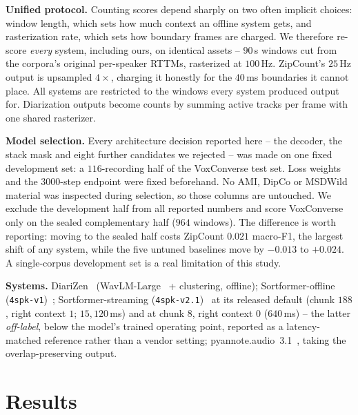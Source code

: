 \documentclass[10pt,conference]{IEEEtran}
\newcommand{\sys}{ZipCount}
\begin{document}
\textbf{Unified protocol.} Counting scores depend sharply on two often
implicit choices: window length, which sets how much context an offline
system gets, and rasterization rate, which sets how boundary frames are
charged. We therefore re-score \emph{every} system, including ours, on
identical assets -- $90$\,s windows cut from the corpora's original
per-speaker RTTMs, rasterized at $100$\,Hz. \sys{}'s $25$\,Hz output is
upsampled $4\times$, charging it honestly for the $40$\,ms boundaries it
cannot place. All systems are restricted to the windows every system
produced output for. Diarization outputs become counts by summing active
tracks per frame with one shared rasterizer.

\textbf{Model selection.}
\label{sec:selection}
Every architecture decision reported here -- the decoder, the stack mask and
eight further candidates we rejected -- was made on one fixed development
set: a $116$-recording half of the VoxConverse test set. Loss weights and
the $3000$-step endpoint were fixed beforehand. No AMI, DipCo or MSDWild
material was inspected during selection, so those columns are untouched. We
exclude the development half from all reported numbers and score VoxConverse
only on the sealed complementary half ($964$ windows). The difference is
worth reporting: moving to the sealed half costs \sys{} $0.021$ macro-F1,
the largest shift of any system, while the five untuned baselines move by
$-0.013$ to $+0.024$. A single-corpus development set is a real limitation
of this study.

\textbf{Systems.} DiariZen~\cite{han2024diarizen} (WavLM-Large~\cite{chen2022wavlm}
+ clustering, offline); Sortformer-offline (\texttt{4spk-v1})~\cite{park2024sortformer};
Sortformer-streaming (\texttt{4spk-v2.1})~\cite{medennikov2025streamingsortformer}
at its released default (chunk
$188$, right context $1$; $15{,}120$\,ms) and at chunk $8$, right context
$0$ ($640$\,ms) -- the latter \emph{off-label}, below the model's trained
operating point, reported as a latency-matched reference rather than a
vendor setting; pyannote.audio~3.1~\cite{bredin2023pyannote}, taking the
overlap-preserving output.

\section{Results}
\label{sec:results}
\end{document}
